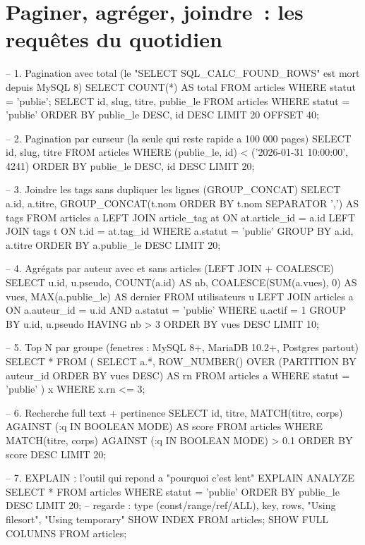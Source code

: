 \documentclass[12pt,a4paper,twoside,openright]{book}
\begin{document}
\section{Paginer, agr\'eger, joindre~: les requ\^etes du quotidien}

\begin{codesql}
-- 1. Pagination avec total (le "SELECT SQL_CALC_FOUND_ROWS" est mort depuis MySQL 8)
SELECT COUNT(*) AS total FROM articles WHERE statut = 'publie';
SELECT id, slug, titre, publie_le FROM articles
WHERE statut = 'publie'
ORDER BY publie_le DESC, id DESC
LIMIT 20 OFFSET 40;

-- 2. Pagination par curseur (la seule qui reste rapide a 100 000 pages)
SELECT id, slug, titre FROM articles
WHERE (publie_le, id) < ('2026-01-31 10:00:00', 4241)
ORDER BY publie_le DESC, id DESC LIMIT 20;

-- 3. Joindre les tags sans dupliquer les lignes (GROUP_CONCAT)
SELECT a.id, a.titre, GROUP_CONCAT(t.nom ORDER BY t.nom SEPARATOR ',') AS tags
FROM articles a
LEFT JOIN article_tag at ON at.article_id = a.id
LEFT JOIN tags t ON t.id = at.tag_id
WHERE a.statut = 'publie'
GROUP BY a.id, a.titre
ORDER BY a.publie_le DESC
LIMIT 20;

-- 4. Agr\'egats par auteur avec et sans articles (LEFT JOIN + COALESCE)
SELECT u.id, u.pseudo,
       COUNT(a.id) AS nb,
       COALESCE(SUM(a.vues), 0) AS vues,
       MAX(a.publie_le) AS dernier
FROM utilisateurs u
LEFT JOIN articles a ON a.auteur_id = u.id AND a.statut = 'publie'
WHERE u.actif = 1
GROUP BY u.id, u.pseudo
HAVING nb > 3
ORDER BY vues DESC
LIMIT 10;

-- 5. Top N par groupe (fenetres : MySQL 8+, MariaDB 10.2+, Postgres partout)
SELECT * FROM (
  SELECT a.*, ROW_NUMBER() OVER (PARTITION BY auteur_id ORDER BY vues DESC) AS rn
  FROM articles a WHERE statut = 'publie'
) x WHERE x.rn <= 3;

-- 6. Recherche full text + pertinence
SELECT id, titre, MATCH(titre, corps) AGAINST (:q IN BOOLEAN MODE) AS score
FROM articles WHERE MATCH(titre, corps) AGAINST (:q IN BOOLEAN MODE) > 0.1
ORDER BY score DESC LIMIT 20;

-- 7. EXPLAIN : l'outil qui repond a "pourquoi c'est lent"
EXPLAIN ANALYZE SELECT * FROM articles WHERE statut = 'publie' ORDER BY publie_le DESC LIMIT 20;
-- regarde : type (const/range/ref/ALL), key, rows, "Using filesort", "Using temporary"
SHOW INDEX FROM articles; SHOW FULL COLUMNS FROM articles;
\end{codesql}
\end{document}
